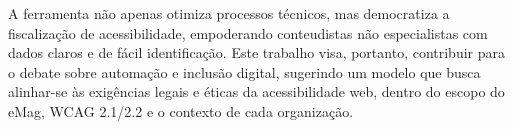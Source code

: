 \documentclass[
    12pt,
    a4paper,
    oneside,
    brazil,
    english
]{article}
\begin{document}
A ferramenta não apenas otimiza processos técnicos, mas democratiza
a fiscalização de acessibilidade, empoderando conteudistas não especialistas
com dados claros e de fácil identificação. Este trabalho visa, portanto, contribuir
para o debate sobre automação e inclusão digital, sugerindo um modelo que busca alinhar-se às exigências legais e éticas da
acessibilidade web, dentro do escopo do eMag, WCAG 2.1/2.2 e o contexto de cada
organização.



\end{document}
